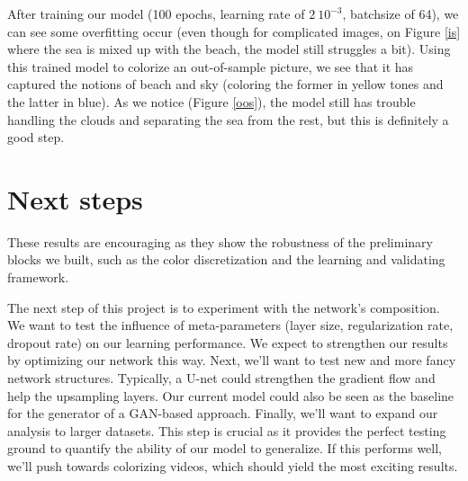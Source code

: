 \documentclass[10pt,twocolumn,letterpaper]{article}
\begin{document}
After training our model (100 epochs, learning rate of $2~10^{-3}$, batchsize of 64), we can see some overfitting occur (even though for complicated images, \eg on Figure \ref{is} where the sea is mixed up with the beach, the model still struggles a bit).
Using this trained model to colorize an out-of-sample picture, we see that it has captured the notions of beach and sky (coloring the former in yellow tones and the latter in blue). As we notice (Figure \ref{oos}), the model still has trouble handling the clouds and separating the sea from the rest, but this is definitely a good step.

\section{Next steps}

%

These results are encouraging as they show the robustness of the preliminary blocks we built, such as the color discretization and the learning and validating framework.

The next step of this project is to experiment with the network's composition. We want to test the influence of meta-parameters (layer size, regularization rate, dropout rate) on our learning performance. We expect to strengthen our results by optimizing our network this way. Next, we'll want to test new and more fancy network structures. Typically, a U-net could strengthen the gradient flow and help the upsampling layers. Our current model could also be seen as the baseline for the generator of a GAN-based approach.
Finally, we'll want to expand our analysis to larger datasets. This step is crucial as it provides the perfect testing ground to quantify the ability of our model to generalize. If this performs well, we'll push towards colorizing videos, which should yield the most exciting results.

{\small


}
\end{document}
